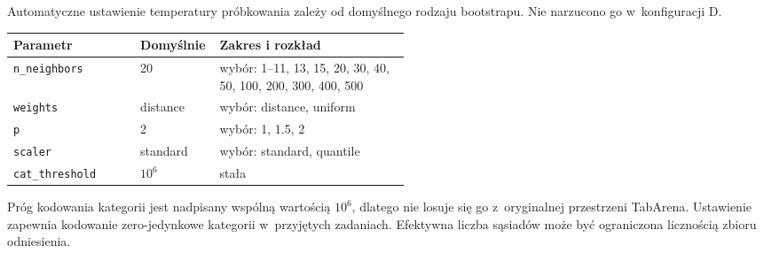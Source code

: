 Automatyczne ustawienie temperatury próbkowania zależy od domyślnego rodzaju bootstrapu. Nie narzucono go w~konfiguracji D.

\par\medskip\noindent\begin{minipage}{\linewidth}\captionsetup{hypcap=false}\centering\footnotesize
{}
\begin{tabularx}{\linewidth}{@{}P{0.32\linewidth}P{0.20\linewidth}Y@{}}
\toprule Parametr & Domyślnie & Zakres i rozkład \\
\midrule
\texttt{n\_neighbors} & 20 & wybór: 1--11, 13, 15, 20, 30, 40, 50, 100, 200, 300, 400, 500 \\
\texttt{weights} & distance & wybór: distance, uniform \\
\texttt{p} & 2 & wybór: 1, 1.5, 2 \\
\texttt{scaler} & standard & wybór: standard, quantile \\
\texttt{cat\_threshold} & $10^6$ & stała \\
\bottomrule\end{tabularx}\end{minipage}\par\medskip

Próg kodowania kategorii jest nadpisany wspólną wartością $10^6$, dlatego nie losuje się go z~oryginalnej przestrzeni TabArena. Ustawienie zapewnia kodowanie zero-jedynkowe kategorii w~przyjętych zadaniach. Efektywna liczba sąsiadów może być ograniczona licznością zbioru odniesienia.

